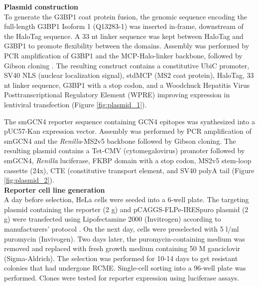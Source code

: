 \textbf{Plasmid construction} \\
To generate the G3BP1 coat protein fusion, the genomic sequence encoding the full-length G3BP1 Isoform 1 (Q13283-1) was inserted in-frame, downstream of the HaloTag sequence.
A 33 nt linker sequence was kept between HaloTag and G3BP1 to promote flexibility between the domains.
Assembly was performed by PCR amplification of G3BP1 and the MCP-Halo-linker backbone, followed by Gibson cloning \cite{gibson_enzymatic_2009}.
The resulting construct contains a constitutive UbiC promoter, SV40 NLS (nuclear localization signal), stdMCP (MS2 coat protein), HaloTag, 33 nt linker sequence, G3BP1 with a stop codon, and a  Woodchuck Hepatitis Virus Posttranscriptional Regulatory Element (WPRE) improving expression in lentiviral transfection (Figure \ref{fig:plasmid_1}).

The smGCN4 reporter sequence containing GCN4 epitopes was synthesized into a pUC57-Kan expression vector.
Assembly was performed by PCR amplification of smGCN4 and the \textit{Renilla}-MS2v5 backbone followed by Gibson cloning.
The resulting plasmid contains a Tet-CMV (cytomegalovirus) promoter followed by smGCN4, \textit{Renilla} luciferase, FKBP domain with a stop codon, MS2v5 stem-loop cassette (24x), CTE (constitutive transport element, and SV40 polyA tail (Figure \ref{fig:plasmid_2}).
\\

\textbf{Reporter cell line generation} \\
A day before selection, HeLa cells were seeded into a 6-well plate.
The targeting plasmid containing the reporter (2 \textmu g) and pCAGGS-FLPe-IRESpuro plasmid (2 \textmu g) were transfected using Lipofectamine 2000 (Invitrogen) according to manufacturers’ protocol \cite{beard_efficient_2006}.
On the next day, cells were preselected with 5 \textmu l/ml puromycin (Invivogen). Two days later, the puromycin-containing medium was removed and replaced with fresh growth medium containing 50 \textmu M ganciclovir (Sigma-Aldrich).
The selection was performed for 10-14 days to get resistant colonies that had undergone RCME.
Single-cell sorting into a 96-well plate was performed.
Clones were tested for reporter expression using luciferase assays.
\\

